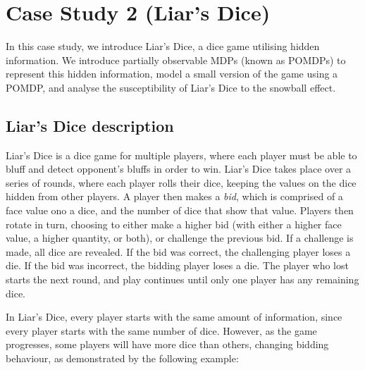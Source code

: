 \chapter{Case Study 2 (Liar's Dice)}
\label{cs2:liars_dice}

In this case study, we introduce Liar's Dice, a dice game utilising hidden information. We introduce partially observable MDPs (known as POMDPs) to represent this hidden information, model a small version of the game using a POMDP, and analyse the susceptibility of Liar's Dice to the snowball effect.

\section{Liar's Dice description}
\label{cs2:liars_dice_description}
Liar's Dice is a dice game for multiple players, where each player must be able to bluff and detect opponent's bluffs in order to win. Liar's Dice takes place over a series of rounds, where each player rolls their dice, keeping the values on the dice hidden from other players. A player then makes a \emph{bid}, which is comprised of a face value ono a dice, and the number of dice that show that value. Players then rotate in turn, choosing to either make a higher bid (with either a higher face value, a higher quantity, or both), or challenge the previous bid. If a challenge is made, all dice are revealed. If the bid was correct, the challenging player loses a die. If the bid was incorrect, the bidding player loses a die. The player who lost starts the next round, and play continues until only one player has any remaining dice.

In Liar's Dice, every player starts with the same amount of information, since every player starts with the same number of dice. However, as the game progresses, some players will have more dice than others, changing bidding behaviour, as demonstrated by the following example:

